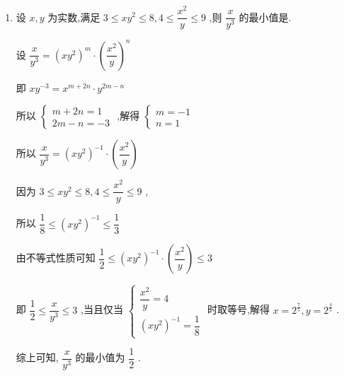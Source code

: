 \begin{enumerate}
\begin{jieda}
        故 $- 5 \leq  2\left( {x - y}\right)  - \left( {x + {6y}}\right)  \leq  {10}$ 即 $- 5 \leq  z \leq  {10}$
    \end{jieda}
    \item 设 $x,y$ 为实数,满足 $3 \leq  x{y}^{2} \leq  8,4 \leq  \dfrac{{x}^{2}}{y} \leq  9$ ,则 $\dfrac{x}{{y}^{3}}$ 的最小值是.
    \begin{jieda}
        设 $\dfrac{x}{{y}^{3}} = {\left( x{y}^{2}\right) }^{m} \cdot  {\left( \dfrac{{x}^{2}}{y}\right) }^{n}$
        
        即 $x{y}^{-3} = {x}^{m + {2n}} \cdot  {y}^{{2m} - n}$
        
        所以 $\left\{  \begin{array}{l} m + {2n} = 1 \\  {2m} - n =  - 3 \end{array}\right.$ ,解得 $\left\{  \begin{array}{l} m =  - 1 \\  n = 1 \end{array}\right.$
        
        所以 $\dfrac{x}{{y}^{3}} = {\left( x{y}^{2}\right) }^{-1} \cdot  \left( \dfrac{{x}^{2}}{y}\right)$
        
        因为 $3 \leq  x{y}^{2} \leq  8,4 \leq  \dfrac{{x}^{2}}{y} \leq  9$ ,
        
        所以 $\dfrac{1}{8} \leq  {\left( x{y}^{2}\right) }^{-1} \leq  \dfrac{1}{3}$
        
        由不等式性质可知 $\dfrac{1}{2} \leq  {\left( x{y}^{2}\right) }^{-1} \cdot  \left( \dfrac{{x}^{2}}{y}\right)  \leq  3$
        
        即 $\dfrac{1}{2} \leq  \dfrac{x}{{y}^{3}} \leq  3$ ,当且仅当 $\left\{  \begin{array}{l} \dfrac{{x}^{2}}{y} = 4 \\  {\left( x{y}^{2}\right) }^{-1} = \dfrac{1}{8} \end{array}\right.$ 时取等号,解得 $x = {2}^{\frac{7}{5}},y = {2}^{\frac{4}{5}}$ .
        
        综上可知, $\dfrac{x}{{y}^{3}}$ 的最小值为 $\dfrac{1}{2}$ .
    \end{jieda}
    

\end{enumerate}
